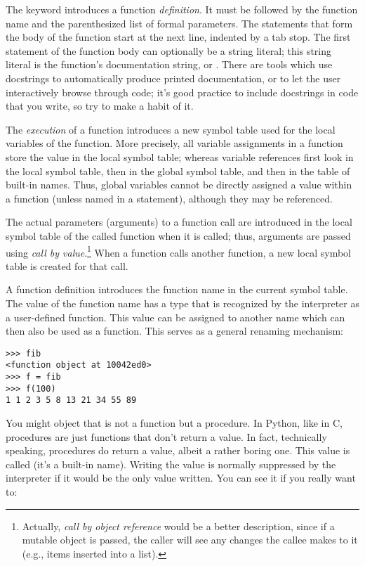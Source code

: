 \documentclass{manual}
\begin{document}
The keyword  introduces a function \emph{definition}.  It
must be followed by the function name and the parenthesized list of
formal parameters.  The statements that form the body of the function
start at the next line, indented by a tab stop.  The first statement
of the function body can optionally be a string literal; this string
literal is the function's documentation string, or .
There are tools which use docstrings to automatically produce printed
documentation, or to let the user interactively browse through code;
it's good practice to include docstrings in code that you write, so
try to make a habit of it.

The \emph{execution} of a function introduces a new symbol table used
for the local variables of the function.  More precisely, all variable
assignments in a function store the value in the local symbol table;
whereas variable references first look in the local symbol table, then
in the global symbol table, and then in the table of built-in names.
Thus,  global variables cannot be directly assigned a value within a
function (unless named in a  statement), although
they may be referenced.

The actual parameters (arguments) to a function call are introduced in
the local symbol table of the called function when it is called; thus,
arguments are passed using \emph{call by value}.\footnote{
         Actually, \emph{call by object reference} would be a better
         description, since if a mutable object is passed, the caller
         will see any changes the callee makes to it (e.g., items
         inserted into a list).
}
When a function calls another function, a new local symbol table is
created for that call.

A function definition introduces the function name in the current
symbol table.  The value of the function name
has a type that is recognized by the interpreter as a user-defined
function.  This value can be assigned to another name which can then
also be used as a function.  This serves as a general renaming
mechanism:

\begin{verbatim}
>>> fib
<function object at 10042ed0>
>>> f = fib
>>> f(100)
1 1 2 3 5 8 13 21 34 55 89
\end{verbatim}

You might object that  is not a function but a procedure.  In
Python, like in C, procedures are just functions that don't return a
value.  In fact, technically speaking, procedures do return a value,
albeit a rather boring one.  This value is called  (it's a
built-in name).  Writing the value  is normally suppressed by
the interpreter if it would be the only value written.  You can see it
if you really want to:
\end{document}
